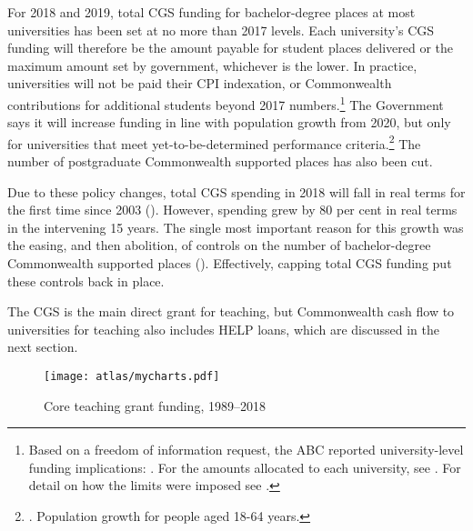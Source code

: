 \documentclass{grattan}
\begin{document}
For 2018 and 2019, total CGS funding for bachelor-degree places at most universities has been set at no more than 2017 levels. Each university's CGS funding will therefore be the amount payable for student places delivered or the maximum amount set by government, whichever is the lower. In practice, universities will not be paid their CPI indexation, or Commonwealth contributions for additional students beyond 2017 numbers.\footnote{Based on a freedom of information request, the ABC reported university-level funding implications: \textcite[][]{Conifer2018universityfunding}. For the amounts allocated to each university, see \textcite[][]{DepartmentofEducationandTraining2018highereducationpr}. For detail on how the limits were imposed see \textcite[][]{Norton2017theaustralianhybr}.} The Government says it will increase funding in line with population growth from 2020, but only for universities that meet yet-to-be-determined performance criteria.\footnote{\textcite[][]{Birmingham2017sustainabilityand}. Population growth for people aged 18-64 years.} The number of postgraduate Commonwealth supported places has also been cut.

Due to these policy changes, total CGS spending in 2018 will fall in real terms for the first time since 2003 (). However, spending grew by 80 per cent in real terms in the intervening 15 years. The single most important reason for this growth was the easing, and then abolition, of controls on the number of bachelor-degree Commonwealth supported places (). Effectively, capping total CGS funding put these controls back in place.

The CGS is the main direct grant for teaching, but Commonwealth cash flow to universities for teaching also includes HELP loans, which are discussed in the next section.


    \begin{figure} %
    \caption{Core teaching grant funding, 1989--2018}\label{fig:core-teaching-grant-funding-19892018}
    \texttt{[image: atlas/mycharts.pdf]}
    \end{figure}
\end{document}
